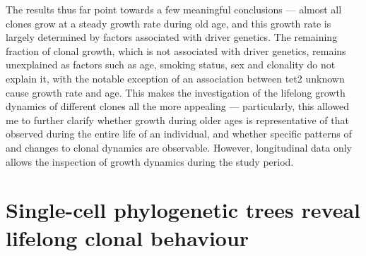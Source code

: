 \begin{figure}[!ht]
	\label{fig:ch-variance-uc-technical}
\end{figure}

\begin{figure}[!ht]
	\label{fig:ch-variance-uc-biological}
\end{figure}

The results thus far point towards a few meaningful conclusions --- almost all clones grow at a steady growth rate during old age, and this growth rate is largely determined by factors associated with driver genetics. The remaining fraction of clonal growth, which is not associated with driver genetics, remains unexplained as factors such as age, smoking status, sex and clonality do not explain it, with the notable exception of an association between \ac{tet2} unknown cause growth rate and age. This makes the investigation of the lifelong growth dynamics of different clones all the more appealing --- particularly, this allowed me to further clarify whether growth during older ages is representative of that observed during the entire life of an individual, and whether specific patterns of and changes to clonal dynamics are observable. However, longitudinal data only allows the inspection of growth dynamics during the study period.

\section{Single-cell phylogenetic trees reveal lifelong clonal behaviour}


